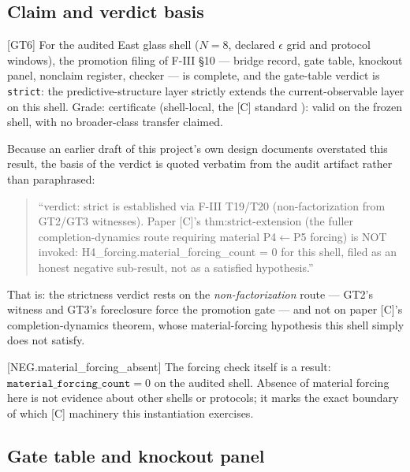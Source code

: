 \documentclass[11pt]{article}
\newcommand{\claimref}[2]{[#1]}
\newcommand{\sbtcite}[1]{\cite{#1}}
\theoremstyle{definition}
\begin{document}
\subsection{Claim and verdict basis}

\claimref{GT6}{6453d0e36a5f43e0a3e7ed9f69f53e00a3c6cef7aa1ddea4019522d5670cab97}
For the audited East glass shell ($N=8$, declared $\epsilon$ grid and protocol windows), the
promotion filing of F-III \S10 --- bridge record, gate table, knockout panel, nonclaim register,
checker --- is complete, and the gate-table verdict is \texttt{strict}: the predictive-structure
layer strictly extends the current-observable layer on this shell. Grade: certificate
(shell-local, the [C] standard \sbtcite{sbt-paper-c}): valid on the frozen shell, with no
broader-class transfer claimed.

Because an earlier draft of this project's own design documents overstated this result, the basis
of the verdict is quoted verbatim from the audit artifact rather than paraphrased:

\begin{quote}
``verdict: strict is established via F-III T19/T20 (non-factorization from GT2/GT3 witnesses).
Paper [C]'s thm:strict-extension (the fuller completion-dynamics route requiring material
P4$\leftarrow$P5 forcing) is NOT invoked: H4\_forcing.material\_forcing\_count = 0 for this shell,
filed as an honest negative sub-result, not as a satisfied hypothesis.''
\end{quote}

That is: the strictness verdict rests on the \emph{non-factorization} route --- GT2's witness and
GT3's foreclosure force the promotion gate --- and not on paper [C]'s completion-dynamics theorem,
whose material-forcing hypothesis this shell simply does not satisfy.

\claimref{NEG.material\_forcing\_absent}{f5f9558e0ffa786ac8a28254e555d398eff572d2936aea89a889ea160cb7bed2}
The forcing check itself is a result: $\texttt{material\_forcing\_count} = 0$ on the audited
shell. Absence of material forcing here is not evidence about other shells or protocols; it marks
the exact boundary of which [C] machinery this instantiation exercises.

\subsection{Gate table and knockout panel}
\end{document}
